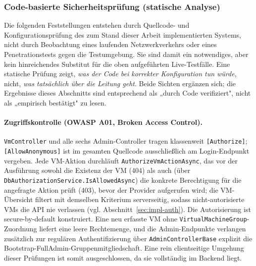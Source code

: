 \documentclass[12pt,a4paper]{article}
\begin{document}
\subsubsection{Code-basierte Sicherheitsprüfung (statische Analyse)}
\label{sec:code-security-review}

Die folgenden Feststellungen entstehen durch Quellcode- und Konfigurationsprüfung des zum Stand dieser Arbeit implementierten Systems, nicht durch Beobachtung eines laufenden Netzwerkverkehrs oder eines Penetrationstests gegen die Testumgebung. Sie sind damit ein notwendiges, aber kein hinreichendes Substitut für die oben aufgeführten Live-Testfälle. Eine statische Prüfung zeigt, \emph{was der Code bei korrekter Konfiguration tun würde}, nicht, \emph{was tatsächlich über die Leitung geht}. Beide Sichten ergänzen sich; die Ergebnisse dieses Abschnitts sind entsprechend als „durch Code verifiziert", nicht als „empirisch bestätigt" zu lesen.

\paragraph{Zugriffskontrolle (OWASP A01, Broken Access Control).} \texttt{VmController} und alle sechs Admin-Controller tragen klassenweit \texttt{[Authorize]}; \texttt{[AllowAnonymous]} ist im gesamten Quellcode ausschließlich am Login-Endpunkt vergeben. Jede VM-Aktion durchläuft \texttt{AuthorizeVmActionAsync}, das vor der Ausführung sowohl die Existenz der VM (404) als auch (über \texttt{DbAuthorizationService.IsAllowedAsync}) die konkrete Berechtigung für die angefragte Aktion prüft (403), bevor der Provider aufgerufen wird; die VM-Übersicht filtert mit demselben Kriterium serverseitig, sodass nicht-autorisierte VMs die API nie verlassen (vgl. Abschnitt~\ref{sec:impl-auth}). Die Autorisierung ist secure-by-default konstruiert. Eine neu erfasste VM ohne \texttt{VirtualMachineGroup}-Zuordnung liefert eine leere Rechtemenge, und die Admin-Endpunkte verlangen zusätzlich zur regulären Authentifizierung über \texttt{AdminControllerBase} explizit die Bootstrap-FullAdmin-Gruppenmitgliedschaft. Eine rein clientseitige Umgehung dieser Prüfungen ist somit ausgeschlossen, da sie vollständig im Backend liegt.
\end{document}
